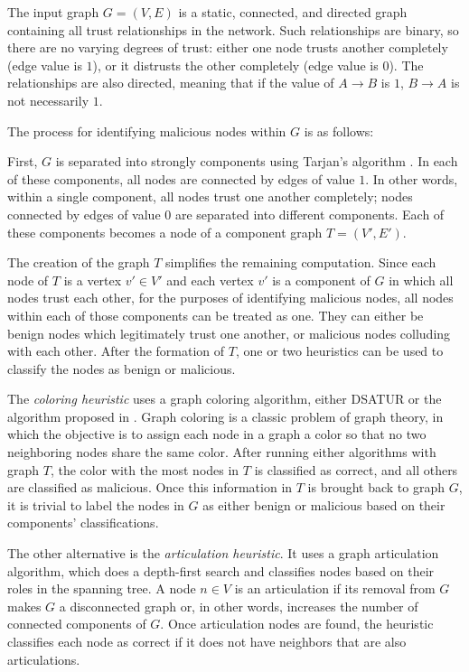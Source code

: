 The input graph $G = (V,E)$ is a static, connected, and directed graph containing all trust relationships in the network.
Such relationships are binary, so there are no varying degrees of trust: either one node trusts another completely (edge value is $1$), or it distrusts the other completely (edge value is $0$).
The relationships are also directed, meaning that if the value of $A\rightarrow B$ is $1$, $B\rightarrow A$ is not necessarily $1$.

The process for identifying malicious nodes within $G$ is as follows:

First, $G$ is separated into strongly components using Tarjan's algorithm \cite{tarjan1972depth}.
In each of these components, all nodes are connected by edges of value $1$.
In other words, within a single component, all nodes trust one another completely; nodes connected by edges of value $0$ are separated into different components.
Each of these components becomes a node of a component graph $T = (V', E')$.

The creation of the graph $T$ simplifies the remaining computation.
Since each node of $T$ is a vertex $v' \in V'$ and each vertex $v'$ is a component of $G$ in which all nodes trust each other, for the purposes of identifying malicious nodes, all nodes within each of those components can be treated as one.
They can either be benign nodes which legitimately trust one another, or malicious nodes colluding with each other.
After the formation of $T$, one or two heuristics can be used to classify the nodes as benign or malicious.

The \textit{coloring heuristic} uses a graph coloring algorithm, either DSATUR \cite{brelaz1979new} or the algorithm proposed in \cite{mittal2011graph}.
Graph coloring is a classic problem of graph theory, in which the objective is to assign each node in a graph a color so that no two neighboring nodes share the same color.
After running either algorithms with graph $T$, the color with the most nodes in $T$ is classified as correct, and all others are classified as malicious.
Once this information in $T$ is brought back to graph $G$, it is trivial to label the nodes in $G$ as either benign or malicious based on their components' classifications.

The other alternative is the \textit{articulation heuristic}.
It uses a graph articulation algorithm, which does a depth-first search and classifies nodes based on their roles in the spanning tree.
A node $n \in V$ is an articulation if its removal from $G$ makes $G$ a disconnected graph or, in other words, increases the number of connected components of $G$.
Once articulation nodes are found, the heuristic classifies each node as correct if it does not have neighbors that are also articulations.

